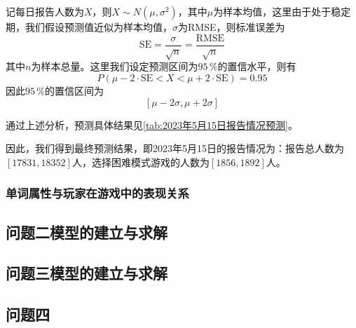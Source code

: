 \documentclass{MathModeling}
\begin{document}
记每日报告人数为$X$，则$X\sim N(\mu,\sigma^2)$，其中$\mu$为样本均值，这里由于处于稳定期，我们假设预测值近似为样本均值，$\sigma$为RMSE，则标准误差为
\begin{equation}
	\text{SE}=\frac{\sigma}{\sqrt{n}}=\frac{\text{RMSE}}{\sqrt{n}}
\end{equation}
其中$n$为样本总量。这里我们设定预测区间为$95\,\%$的置信水平，则有
\begin{equation}
	P(\mu-2\cdot\text{SE} < X < \mu+2\cdot\text{SE})=0.95
\end{equation}
因此$95\,\%$的置信区间为
\begin{equation}
	\left[\mu-2\sigma,\mu+2\sigma\right]
\end{equation}

通过上述分析，预测具体结果见\textcolor{blue}{\cref{tab:2023年5月15日报告情况预测}}。
\begin{table}[H]
	\centering
	\caption{2023年5月15日报告情况预测结果}
	\label{tab:2023年5月15日报告情况预测}
\end{table}

因此，我们得到最终预测结果，即2023年5月15日的报告情况为：报告总人数为$\left[17831,18352\right]$人，选择困难模式游戏的人数为$\left[1856,1892\right]$人。
	\subsubsection{单词属性与玩家在游戏中的表现关系}
	
	\subsection{问题二模型的建立与求解}
	
	\subsection{问题三模型的建立与求解}
  
	\subsection{问题四}
\end{document}
